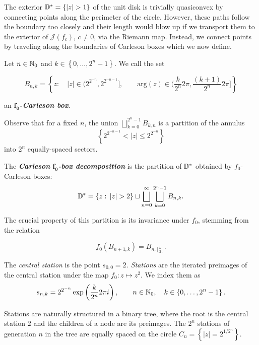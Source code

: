 The exterior $\D^{*}=\left\{ \left|z\right|>1\right\} $ of the unit
disk is trivially quasiconvex by connecting points along the perimeter
of the circle. However, these paths follow the boundary too closely
and their length would blow up if we transport them to the exterior
of $\mathcal{J}(f_{c})$, $c\neq0$, via the Riemann map. Instead,
we connect points by traveling along the boundaries of Carleson boxes
which we now define.
\begin{definition}
Let $n\in\mathbb{N}_{0}$ and $k\in\left\{ 0,\ldots,2^{n}-1\right\} $. We
call the set

\[
B_{n,k}=\left\{ z:\quad\left|z\right|\in\biggl(2^{2^{-n}},2^{2^{-n-1}}\biggl],\qquad\mathrm{arg}(z)\in\biggl(\frac{k}{2^{n}}2\pi,\frac{(k+1)}{2^{n}}2\pi\biggl]\right\} 
\]

an \emph{$\boldsymbol{f_{0}}$}\textbf{\emph{-Carleson box}}\emph{.} 

Observe that for a fixed $n$, the union $\bigsqcup_{k=0}^{2^{n}-1}B_{k,n}$
is a partition of the annulus 
\[
\left\{ 2^{2^{-n-1}}<\left|z\right|\leq2^{2^{-n}}\right\} 
\]
 into $2^{n}$ equally-spaced sectors.

The\emph{ }\textbf{\emph{Carleson }}\emph{$\boldsymbol{f_{0}}$}\textbf{\emph{-box
decomposition}} is the partition of $\mathbb{D}^{*}$ obtained by $f_{0}$-Carleson
boxes:
\[
\D^{*}=\left\{ z:\,\left|z\right|>2\right\} \sqcup\bigsqcup_{n=0}^{\infty}\bigsqcup_{k=0}^{2^{n}-1}B_{n,k}.
\]

The crucial property of this partition is its invariance under $f_{0}$,
stemming from the relation

\[
f_{0}\left(B_{n+1,k}\right)=B_{n,\lfloor\frac{k}{2}\rfloor}.
\]
\end{definition}

\begin{comment}
We describe the motion along quasigeodesics as a train drive. Accordingly,
we proceed to define "stations"{} and "tracks".
\end{comment}

\begin{definition}
The \emph{central station }is the point\emph{ $s_{0,0}=2$. Stations
}are the iterated preimages of the central station under the map $f_{0}:z\mapsto z^{2}$.
We index them as 
\[
s_{n,k}=2^{2^{-n}}\exp\left(\frac{k}{2^{n}}2\pi i\right),\qquad n\in\mathbb{N}_{0},\quad k\in\left\{ 0,\ldots,2^{n}-1\right\} .
\]

Stations are naturally structured in a binary tree, where the root
is the central station $2$ and the children of a node are its preimages.
The $2^{n}$ stations of generation $n$ in the tree are equally spaced
on the circle $C_{n}=\left\{ \left|z\right|=2^{1/2^{n}}\right\} $. 


\end{definition}

